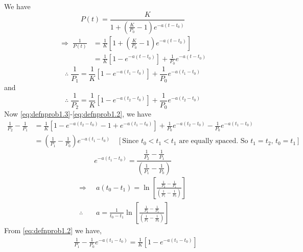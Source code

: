 \documentclass[../main-sheet.tex]{subfiles}
\begin{document}
\begin{soln}
    We have
    \begin{equation}
        P(t)=\frac{K}{1+\left( \frac{K}{P_0}-1 \right)e^{-a(t-t_0)}}
        \label{eq:defnprob1.1}
    \end{equation}
    \begin{align*}
        \Rightarrow\;\frac{1}{P(t)}&=\frac{1}{K}\left[ 1+\left( \frac{K}{P_0}-1 \right)e^{-a(t-t_0)} \right]\\
        &=\frac{1}{K}\left[ 1-e^{-a(t-t_0)} \right]+\frac{1}{P_0}e^{-a(t-t_0)}
    \end{align*}
    \begin{equation}
        \therefore\; \frac{1}{P_1}=\frac{1}{K}\left[ 1-e^{-a(t_1-t_0)} \right]+\frac{1}{P_0}e^{-a(t_1-t_0)}
        \label{eq:defnprob1.2}
    \end{equation}
    and
    \begin{equation}
        \therefore\; \frac{1}{P_2}=\frac{1}{K}\left[ 1-e^{-a(t_2-t_0)} \right]+\frac{1}{P_0}e^{-a(t_2-t_0)}
        \label{eq:defnprob1.3}
    \end{equation}
    Now \eqref{eq:defnprob1.3}-\eqref{eq:defnprob1.2}, we have
    \begin{align*}
        \frac{1}{P_2}-\frac{1}{P_1}&=\frac{1}{K}\left[ 1-e^{-a(t_2-t_0)}-1+e^{-a(t_1-t_0)} \right]+\frac{1}{P_0}e^{-a(t_2-t_0)}-\frac{1}{P_0}e^{-a(t_1-t_0)}\\
        &=\left( \frac{1}{P_1}-\frac{1}{P_0} \right)e^{-a(t_1-t_0)} \quad[\text{Since \(t_0<t_1<t_1\) are equally spaced. So \(t_1=t_2\), \(t_0=t_1\)}]
    \end{align*}
    \begin{equation}
        e^{-a(t_1-t_0)}=\frac{\frac{1}{P_2}-\frac{1}{P_1}}{\left( \frac{1}{P_1}-\frac{1}{P_0} \right)}
        \label{eq:defnprob1.4}
    \end{equation}
    \begin{align*}
        \Rightarrow\;\;& a(t_0-t_1)=\ln\left[ \frac{\frac{1}{P_2}-\frac{1}{P_1}}{\left( \frac{1}{P_1}-\frac{1}{P_0} \right)} \right]\\
        \therefore\;\;& a=\frac{1}{t_0-t_1}\ln\left[ \frac{\frac{1}{P_2}-\frac{1}{P_1}}{\left( \frac{1}{P_1}-\frac{1}{P_0} \right)} \right]
    \end{align*}
    From \eqref{eq:defnprob1.2} we have,
    \begin{align*}
        &\frac{1}{P_1}-\frac{1}{P_0}e^{-a(t_1-t_0)}=\frac{1}{K}\left[ 1-e^{-a(t_1-t_0)} \right]\\

\end{align*}
\end{soln}
\end{document}
